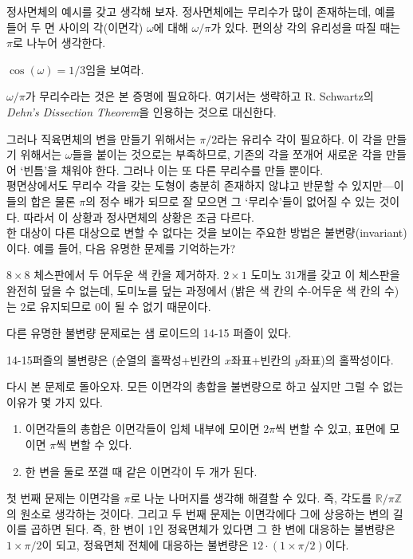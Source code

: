 정사면체의 예시를 갖고 생각해 보자. 정사면체에는 무리수가 많이 존재하는데, 예를 들어 두 면 사이의 각(이면각) $\omega$에 대해 $\omega/\pi$가 있다. 편의상 각의 유리성을 따질 때는 $\pi$로 나누어 생각한다. 
\begin{exercise}
    $\cos(\omega)=1/3$임을 보여라. 
\end{exercise}
\begin{remark}
    $\omega/\pi$가 무리수라는 것은 본 증명에 필요하다. 여기서는 생략하고 R. Schwartz의 \textit{Dehn's Dissection Theorem}을 인용하는 것으로 대신한다. 
\end{remark}
그러나 직육면체의 변을 만들기 위해서는 $\pi/2$라는 유리수 각이 필요하다. 이 각을 만들기 위해서는 $\omega$들을 붙이는 것으로는 부족하므로, 기존의 각을 쪼개어 새로운 각을 만들어 `빈틈'을 채워야 한다. 그러나 이는 또 다른 무리수를 만들 뿐이다. \\
평면상에서도 무리수 각을 갖는 도형이 충분히 존재하지 않냐고 반문할 수 있지만---이들의 합은 물론 $\pi$의 정수 배가 되므로 잘 모으면 그 `무리수'들이 없어질 수 있는 것이다. 따라서 이 상황과 정사면체의 상황은 조금 다르다. \\
한 대상이 다른 대상으로 변할 수 없다는 것을 보이는 주요한 방법은 불변량(invariant)이다. 예를 들어, 다음 유명한 문제를 기억하는가?
\begin{example}
    $8\times 8$ 체스판에서 두 어두운 색 칸을 제거하자. $2\times 1$ 도미노 $31$개를 갖고 이 체스판을 완전히 덮을 수 없는데, 도미노를 덮는 과정에서 (밝은 색 칸의 수-어두운 색 칸의 수)는 $2$로 유지되므로 0이 될 수 없기 때문이다. 
\end{example}
다른 유명한 불변량 문제로는 샘 로이드의 14-15 퍼즐이 있다.
\begin{example}
14-15퍼즐의 불변량은 (순열의 홀짝성+빈칸의 $x$좌표+빈칸의 $y$좌표)의 홀짝성이다. 
\end{example}
다시 본 문제로 돌아오자. 모든 이면각의 총합을 불변량으로 하고 싶지만 그럴 수 없는 이유가 몇 가지 있다. 
\begin{enumerate}
    \item 이면각들의 총합은 이면각들이 입체 내부에 모이면 $2\pi$씩 변할 수 있고, 표면에 모이면 $\pi$씩 변할 수 있다. 
    \item 한 변을 둘로 쪼갤 때 같은 이면각이 두 개가 된다. 
\end{enumerate}
첫 번째 문제는 이면각을 $\pi$로 나눈 나머지를 생각해 해결할 수 있다. 즉, 각도를 $\mathbb{R}/\pi\mathbb{Z}$의 원소로 생각하는 것이다. 그리고 두 번째 문제는 이면각에다 그에 상응하는 변의 길이를 곱하면 된다. 즉, 한 변이 1인 정육면체가 있다면 그 한 변에 대응하는 불변량은 $1\times \pi/2$이 되고, 정육면체 전체에 대응하는 불변량은 $12\cdot(1\times \pi/2)$이다. \\
